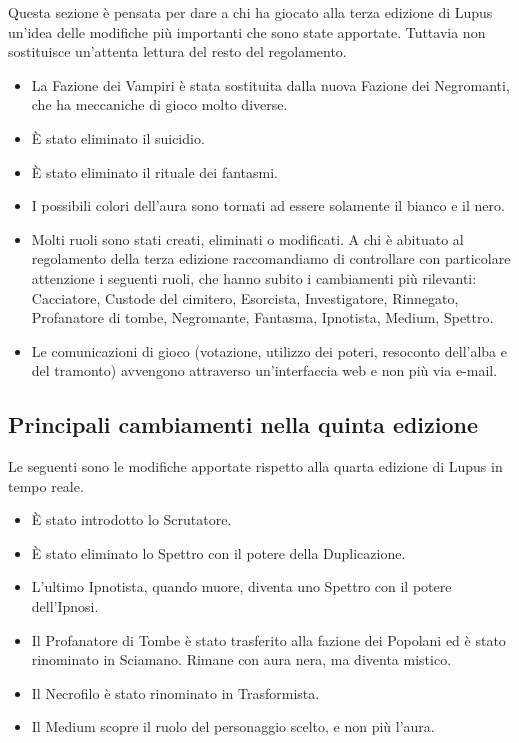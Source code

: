\documentclass[a4paper,10pt]{article}
\begin{document}
Questa sezione è pensata per dare a chi ha giocato alla terza edizione di Lupus
un'idea delle modifiche più importanti che sono state apportate. Tuttavia non
sostituisce un'attenta lettura del resto del regolamento.

\begin{itemize}
 \item La Fazione dei Vampiri è stata sostituita dalla nuova Fazione dei
Negromanti, che ha meccaniche di gioco molto diverse.
 \item È stato eliminato il suicidio.
 \item È stato eliminato il rituale dei fantasmi.
 \item I possibili colori dell'aura sono tornati ad essere solamente il bianco e
il nero.
 \item Molti ruoli sono stati creati, eliminati o modificati. A chi è abituato
al regolamento della terza edizione raccomandiamo di controllare con particolare
attenzione i seguenti ruoli, che hanno subito i cambiamenti più rilevanti:
Cacciatore, Custode del cimitero, Esorcista, Investigatore, Rinnegato, Profanatore di tombe, Negromante, Fantasma, Ipnotista, Medium, Spettro.
 \item Le comunicazioni di gioco (votazione, utilizzo dei poteri, resoconto
dell'alba e del tramonto) avvengono attraverso un'interfaccia web e non più via
e-mail.
\end{itemize}

\subsection{Principali cambiamenti nella quinta edizione}

Le seguenti sono le modifiche apportate rispetto alla quarta edizione di Lupus in tempo reale.

\begin{itemize}
\item È stato introdotto lo Scrutatore.
\item È stato eliminato lo Spettro con il potere della Duplicazione.
\item L'ultimo Ipnotista, quando muore, diventa uno Spettro con il potere dell'Ipnosi.
\item Il Profanatore di Tombe è stato trasferito alla fazione dei
  Popolani ed è stato rinominato in Sciamano. 
  Rimane con aura nera, ma diventa mistico.
\item Il Necrofilo è stato rinominato in Trasformista.
\item Il Medium scopre il ruolo del personaggio scelto, e non più l'aura.
\end{itemize}
\end{document}
